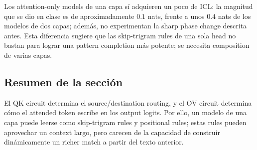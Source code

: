 Los attention-only models de una capa sí adquieren un poco de ICL: la magnitud que se dio en clase es de aproximadamente $0.1$ nats, frente a unos $0.4$ nats de los modelos de dos capas; además, no experimentan la sharp phase change descrita antes. Esta diferencia sugiere que las skip-trigram rules de una sola head no bastan para lograr una pattern completion más potente; se necesita composition de varias capas.



\subsection{Resumen de la sección}

El QK circuit determina el source/destination routing, y el OV circuit determina cómo el attended token escribe en los output logits. Por ello, un modelo de una capa puede leerse como skip-trigram rules y positional rules; estas rules pueden aprovechar un context largo, pero carecen de la capacidad de construir dinámicamente un richer match a partir del texto anterior.
